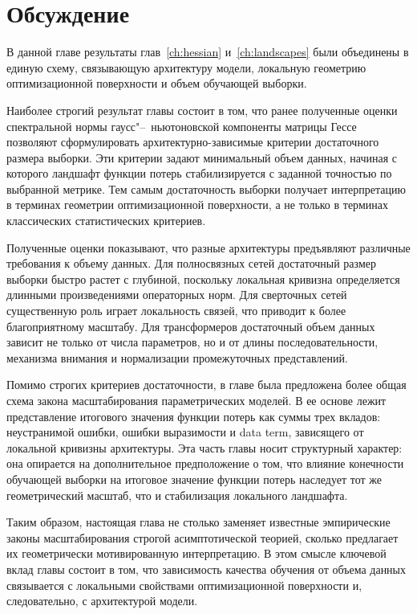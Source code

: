 \section{Обсуждение}

В данной главе результаты глав~\ref{ch:hessian} и~\ref{ch:landscapes} были объединены в единую схему, связывающую архитектуру модели, локальную геометрию оптимизационной поверхности и объем обучающей выборки.

Наиболее строгий результат главы состоит в том, что ранее полученные оценки спектральной нормы гаусс"--~ньютоновской компоненты матрицы Гессе позволяют сформулировать архитектурно-зависимые критерии достаточного размера выборки. Эти критерии задают минимальный объем данных, начиная с которого ландшафт функции потерь стабилизируется с заданной точностью по выбранной метрике. Тем самым достаточность выборки получает интерпретацию в терминах геометрии оптимизационной поверхности, а не только в терминах классических статистических критериев.

Полученные оценки показывают, что разные архитектуры предъявляют различные требования к объему данных. Для полносвязных сетей достаточный размер выборки быстро растет с глубиной, поскольку локальная кривизна определяется длинными произведениями операторных норм. Для сверточных сетей существенную роль играет локальность связей, что приводит к более благоприятному масштабу. Для трансформеров достаточный объем данных зависит не только от числа параметров, но и от длины последовательности, механизма внимания и нормализации промежуточных представлений.

Помимо строгих критериев достаточности, в главе была предложена более общая схема закона масштабирования параметрических моделей. В ее основе лежит представление итогового значения функции потерь как суммы трех вкладов: неустранимой ошибки, ошибки выразимости и data term, зависящего от локальной кривизны архитектуры. Эта часть главы носит структурный характер: она опирается на дополнительное предположение о том, что влияние конечности обучающей выборки на итоговое значение функции потерь наследует тот же геометрический масштаб, что и стабилизация локального ландшафта.

Таким образом, настоящая глава не столько заменяет известные эмпирические законы масштабирования строгой асимптотической теорией, сколько предлагает их геометрически мотивированную интерпретацию. В этом смысле ключевой вклад главы состоит в том, что зависимость качества обучения от объема данных связывается с локальными свойствами оптимизационной поверхности и, следовательно, с архитектурой модели.

